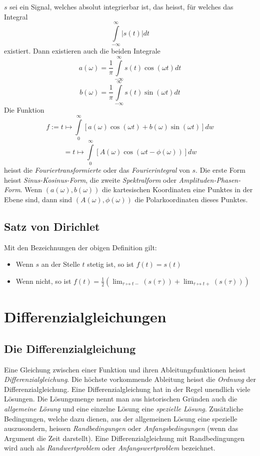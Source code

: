\documentclass[10pt,a4paper]{scrartcl}
\begin{document}
$s$ sei ein Signal, welches absolut integrierbar ist, das heisst, für welches
das Integral
$$\int\limits_{-\infty}^{\infty} |s(t)|dt$$
existiert. Dann existieren auch die beiden Integrale
$$a(\omega) = \frac{1}{\pi} \int\limits_{-\infty}^{\infty} s(t)
    \cos(\omega t)dt$$
$$b(\omega) = \frac{1}{\pi} \int\limits_{-\infty}^{\infty} s(t)
    \sin(\omega t)dt$$
Die Funktion
$$f := t \mapsto \int\limits_0^{\infty} \left[ a(\omega) \cos(\omega t)
    + b(\omega) \sin(\omega t)\right]dw$$
$$=t \mapsto \int\limits_0^{\infty} \left[A(\omega) \cos(\omega t
    - \phi (\omega))\right]dw$$
heisst die \emph{Fouriertransformierte} oder das \emph{Fourierintegral} von
$s$. Die erste Form heisst \emph{Sinus-Kosinus-Form}, die zweite
\emph{Spektralform} oder \emph{Amplituden-Phasen-Form}. Wenn
$(a(\omega), b(\omega))$ die kartesischen Koordinaten eine Punktes in der Ebene
sind, dann sind $(A(\omega), \phi(\omega))$ die Polarkoordinaten dieses Punktes.


\subsection{Satz von Dirichlet}

Mit den Bezeichnungen der obigen Definition gilt:
\begin{itemize}
\item Wenn $s$ an der Stelle $t$ stetig ist, so ist $f(t) = s(t)$
\item Wenn nicht, so ist $\displaystyle f(t) = \frac{1}{2} \left(\lim_{\tau
    \mapsto t-}(s(\tau)) + \lim_{\tau \mapsto t+}(s(\tau))\right)$
\end{itemize}


\section{Differenzialgleichungen}


\subsection{Die Differenzialgleichung}

Eine Gleichung zwischen einer Funktion und ihren Ableitungsfunktionen heisst
\emph{Differenzialgleichung}. Die höchste vorkommende Ableitung heisst die
\emph{Ordnung} der Differenzialgleichung. Eine Differenzialgleichung hat in der
Regel unendlich viele Lösungen. Die Lösungsmenge nennt man aus historischen
Gründen auch die \emph{allgemeine Lösung} und eine einzelne Lösung eine
\emph{spezielle Lösung}.  Zusätzliche Bedingungen, welche dazu dienen, aus der
allgemeinen Lösung eine spezielle auszusondern, heissen \emph{Randbedingungen}
oder \emph{Anfangsbedingungen} (wenn das Argument die Zeit darstellt). Eine
Differenzialgleichung mit Randbedingungen wird auch als \emph{Randwertproblem}
oder \emph{Anfangswertproblem} bezeichnet.
\end{document}
